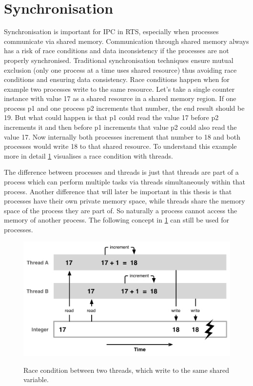 \section{Synchronisation}\label{sec:synchronization}

Synchronisation is important for \ac{IPC} in \ac{RTS}, especially when processes communicate via shared memory. Communication through shared memory always has a risk of race conditions and data inconsistency if the processes are not properly synchronised. Traditional synchronisation techniques ensure mutual exclusion (only one process at a time uses shared resource) thus avoiding race conditions and ensuring data consistency. Race conditions happen when for example two processes write to the same resource. Let's take a single counter instance with value 17 as a shared resource in a shared memory region. If one process p1 and one process p2 increments that number, the end result should be 19. But what could happen is that p1 could read the value 17 before p2 increments it and then before p1 increments that value p2 could also read the value 17. Now internally both processes increment that number to 18 and both processes would write 18 to that shared resource. To understand this example more in detail \cref{fig:race-condition} visualises a race condition with threads. 

The difference between processes and threads is just that threads are part of a process which can perform multiple tasks via threads simultaneously within that process. Another difference that will later be important in this thesis is that processes have their own private memory space, while threads share the memory space of the process they are part of. So naturally a process cannot access the memory of another process. The following concept in \cref{fig:race-condition} can still be used for processes. \cite{processesVSthreads}

\begin{figure}[!ht]
    \centering
    \captionsetup{justification=centering}
    \caption{Race condition between two threads, which write to the same shared variable.}
    \includegraphics[width=115mm]{images/race-condition.png}
    \cite{Race-Condition}
    \label{fig:race-condition}
\end{figure}

